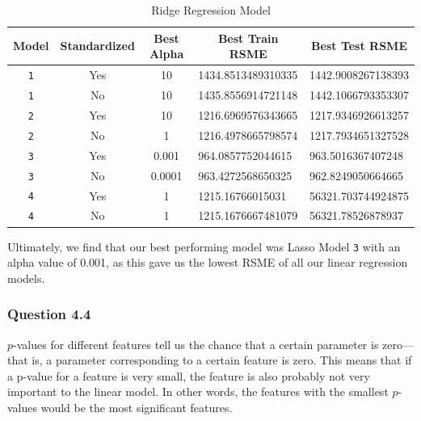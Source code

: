 \documentclass[11pt,letterpaper]{article}
\begin{document}
\begin{table}[H]
    \centering
    \begin{tabular}{cccll}
        \hline
    Model & Standardized &Best Alpha & \multicolumn{1}{c}{Best Train RSME} & \multicolumn{1}{c}{Best Test RSME} \\
    \hline
    \texttt{1}   & Yes      & 10       & 1434.8513489310335                                                   &  1442.9008267138393                                                    \\
    \texttt{1}   & No        & 10       & 1435.8556914721148                                                  & 1442.1066793353307                                                  \\
    \texttt{2}   & Yes        & 10      & 1216.6969576343665                                                   & 1217.9346926613257                                                     \\
    \texttt{2}   & No        & 1      & 1216.4978665798574                                               & 1217.7934651327528                                                   \\
    \texttt{3}   & Yes        & 0.001       & 964.0857752044615                                                    &  963.5016367407248                                                    \\
    \texttt{3}   & No       & 0.0001       & 963.4272568650325                                                   &962.8249050664665                                                     \\
    \texttt{4}   & Yes        & 1       & 1215.16766015031                                                   & 56321.703744924875                                                     \\
    \texttt{4}   & No       & 1       & 1215.1676667481079                                                  & 56321.78526878937                                                    
    \end{tabular}
    \caption{Ridge Regression Model}
\end{table}

Ultimately, we find that our best performing model was Lasso Model \texttt{3} with an alpha value of 
0.001, as this gave us the lowest RSME of all our linear regression models.


\subsubsection*{Question 4.4}
$p$-values for different features tell us the chance that a certain parameter is zero—
that is, a parameter corresponding to a certain feature is zero. This means that if a
p-value for a feature is very small, the feature is also probably not very important to
the linear model. In other words, the features with the smallest $p$-values would be the
most significant features. 
\end{document}
